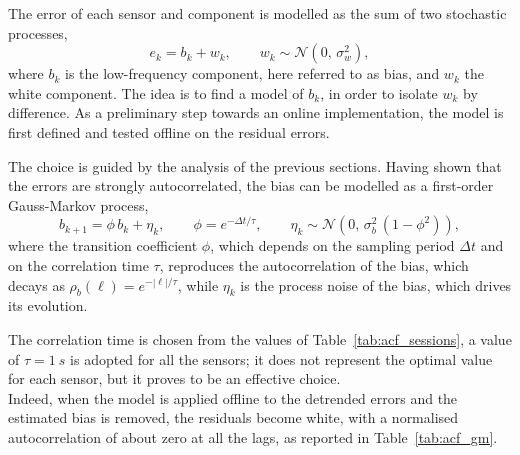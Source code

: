 The error of each sensor and component is modelled as the sum of two stochastic processes,
\begin{equation}
    e_k = b_k + w_k,
    \qquad
    w_k \sim \mathcal{N}\!\left(0,\, \sigma_w^2\right),
    \label{eq:gm_decomposition}
\end{equation}
where $b_k$ is the low-frequency component, here referred to as bias, and $w_k$ the white
component. The idea is to find a model of $b_k$, in order to isolate $w_k$ by
difference. As a preliminary step towards an online implementation, the model is first
defined and tested offline on the residual errors.

The choice is guided by the analysis of the previous sections. Having shown that the errors
are strongly autocorrelated, the bias can be modelled as a first-order Gauss-Markov process,
\begin{equation}
    b_{k+1} = \phi\, b_k + \eta_k,
    \qquad
    \phi = e^{-\Delta t/\tau},
    \qquad
    \eta_k \sim \mathcal{N}\!\left(0,\, \sigma_b^2\,(1-\phi^2)\right),
    \label{eq:gm_process}
\end{equation}
where the transition coefficient $\phi$, which depends on the sampling period $\Delta t$ and
on the correlation time $\tau$, reproduces the autocorrelation of the bias, which decays as
$\rho_b(\ell) = e^{-|\ell|/\tau}$, while $\eta_k$ is the process noise of the bias, which
drives its evolution. 

The correlation time is chosen from the values of Table~\ref{tab:acf_sessions}, a value
of $\tau = \SI{1}{s}$ is adopted for all the sensors; it does not represent
the optimal value for each sensor, but it proves to be an effective choice. \\ Indeed, when the model
is applied offline to the detrended errors and the estimated bias is removed, the
residuals become white, with a normalised autocorrelation of about zero at all the lags,
as reported in Table~\ref{tab:acf_gm}.

